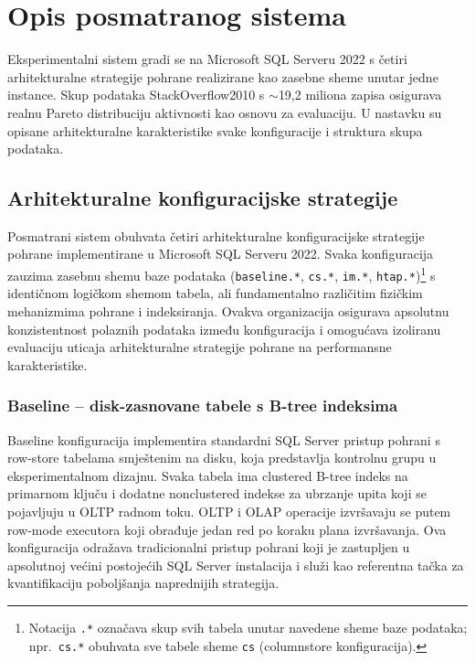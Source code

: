 \chapter{Opis posmatranog sistema}
\label{ch:sistem}

Eksperimentalni sistem gradi se na Microsoft SQL Serveru 2022 s četiri arhitekturalne strategije pohrane realizirane kao zasebne sheme unutar jedne instance. Skup podataka StackOverflow2010 s $\sim$19,2 miliona zapisa osigurava realnu Pareto distribuciju aktivnosti kao osnovu za evaluaciju. U nastavku su opisane arhitekturalne karakteristike svake konfiguracije i struktura skupa podataka.

\section{Arhitekturalne konfiguracijske strategije}
\label{sec:konfiguracije}

Posmatrani sistem obuhvata četiri arhitekturalne konfiguracijske strategije pohrane implementirane u Microsoft SQL Serveru 2022. Svaka konfiguracija zauzima zasebnu shemu baze podataka (\texttt{baseline.*}, \texttt{cs.*}, \texttt{im.*}, \texttt{htap.*})\footnote{Notacija \texttt{.*} označava skup svih tabela unutar navedene sheme baze podataka; npr.\ \texttt{cs.*} obuhvata sve tabele sheme \texttt{cs} (columnstore konfiguracija).} s identičnom logičkom shemom tabela, ali fundamentalno različitim fizičkim mehanizmima pohrane i indeksiranja. Ovakva organizacija osigurava apsolutnu konzistentnost polaznih podataka između konfiguracija i omogućava izoliranu evaluaciju uticaja arhitekturalne strategije pohrane na performansne karakteristike.

\subsection{Baseline -- disk-zasnovane tabele s B-tree indeksima}

Baseline konfiguracija implementira standardni SQL Server pristup pohrani s row-store tabelama smještenim na disku, koja predstavlja kontrolnu grupu u eksperimentalnom dizajnu. Svaka tabela ima clustered B-tree indeks na primarnom ključu i dodatne nonclustered indekse za ubrzanje upita koji se pojavljuju u OLTP radnom toku. OLTP i OLAP operacije izvršavaju se putem row-mode executora koji obrađuje jedan red po koraku plana izvršavanja. Ova konfiguracija odražava tradicionalni pristup pohrani koji je zastupljen u apsolutnoj većini postojećih SQL Server instalacija i služi kao referentna tačka za kvantifikaciju poboljšanja naprednijih strategija.

